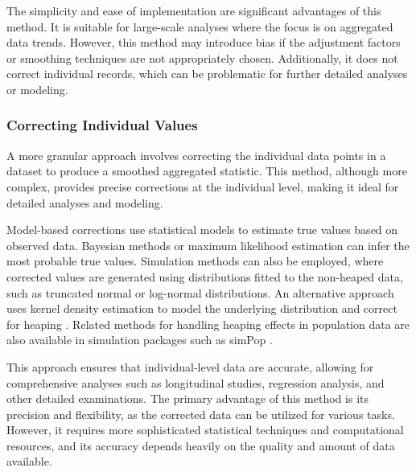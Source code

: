 \documentclass[pdflatex,sn-mathphys-num]{sn-jnl}%
\theoremstyle{thmstyleone}%
\theoremstyle{thmstyletwo}%
\theoremstyle{thmstylethree}%
\begin{document}
The simplicity and ease of implementation are significant advantages of this method. It is suitable for large-scale analyses where the focus is on aggregated data trends. However, this method may introduce bias if the adjustment factors or smoothing techniques are not appropriately chosen. Additionally, it does not correct individual records, which can be problematic for further detailed analyses or modeling.

\subsubsection{Correcting Individual Values}

A more granular approach involves correcting the individual data points in a dataset to produce a smoothed aggregated statistic. This method, although more complex, provides precise corrections at the individual level, making it ideal for detailed analyses and modeling.

Model-based corrections use statistical models to estimate true values based on observed data. Bayesian methods or maximum likelihood estimation can infer the most probable true values. Simulation methods can also be employed, where corrected values are generated using distributions fitted to the non-heaped data, such as truncated normal or log-normal distributions. An alternative approach uses kernel density estimation to model the underlying distribution and correct for heaping \citep{kernelheaping}. Related methods for handling heaping effects in population data are also available in simulation packages such as simPop \citep{simpop}.

This approach ensures that individual-level data are accurate, allowing for comprehensive analyses such as longitudinal studies, regression analysis, and other detailed examinations. The primary advantage of this method is its precision and flexibility, as the corrected data can be utilized for various tasks. However, it requires more sophisticated statistical techniques and computational resources, and its accuracy depends heavily on the quality and amount of data available.


\end{document}
